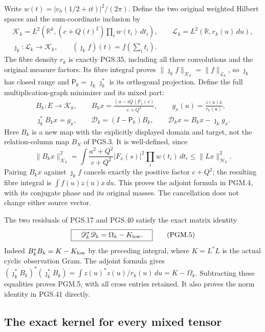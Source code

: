 Write \(w(t)=|v_h(1/2+it)|^2/(2\pi)\). Define the two original
weighted Hilbert spaces and the sum-coordinate inclusion by
\[
\begin{gathered}
 \mathscr K_k=L^2\left(\mathbb{R}^k,
                   (c+Q(t)^2)\prod_i w(t_i)\,dt_i\right),\qquad
 \mathscr L_k=L^2(\mathbb{R},r_k(u)\,du),\\
 \jmath_k:\mathscr L_k\longrightarrow\mathscr K_k,\qquad
          (\jmath_k f)(t)=f\left(\sum_i t_i\right).
\end{gathered}
\tag{PGM.3}\label{GraphV2:eq:pgm-hilbert}
\]
The fibre density \(r_k\) is exactly PGS.35, including all three
convolutions and the original measure factors. Its fibre integral
proves \(\|\jmath_k f\|_{\mathscr K_k}=\|f\|_{\mathscr L_k}\),
so \(\jmath_k\) has closed range and
\(\mathsf P_k=\jmath_k\jmath_k^*\) is its orthogonal projection.
Define the full multiplication-graph minimizer and its mixed part:
\[
\begin{gathered}
 B_k:E\longrightarrow\mathscr K_k,\qquad
 B_kx=\frac{(a-iQ)F_x(s)}{c+Q^2},\qquad
 g_x(u)=\frac{z(u)x}{r_k(u)},\\
 \jmath_k^*B_kx=g_x,\qquad
 \mathscr D_k=(I-\mathsf P_k)B_k,\qquad
 \mathscr D_kx=B_kx-\jmath_k g_x .
\end{gathered}
\tag{PGM.4}\label{GraphV2:eq:pgm-map}
\]
Here \(B_k\) is a new map with the explicitly displayed domain and
target, not the relation-column map \(B_N\) of PGS.3. It is
well-defined, since
\[
 \|B_kx\|_{\mathscr K_k}^2
 =\int\frac{a^2+Q^2}{c+Q^2}|F_x(s)|^2\prod_iw(t_i)\,dt_i
 \leq\|Lx\|_{\mathscr H_k}^2.
\]
Pairing \(B_kx\) against \(\jmath_k f\) cancels exactly the
positive factor \(c+Q^2\); the resulting fibre integral is
\(\int\overline{f(u)}z(u)x\,du\). This proves the adjoint
formula in PGM.4, with its conjugate phase and its original masses.
The cancellation does not change either source vector.

The two residuals of PGS.17 and PGS.40 satisfy the exact matrix
identity
\[
 \boxed{\quad \mathscr D_k^*\mathscr D_k
                       =\Omega_k-K_{\rm low}.\quad}
 \tag{PGM.5}\label{GraphV2:eq:pgm-gram}
\]
Indeed \(B_k^*B_k=K-K_{\rm low}\) by the preceding integral,
where \(K=L^*L\) is the actual cyclic observation Gram.
The adjoint formula gives
\((\jmath_k^*B_k)^*(\jmath_k^*B_k)=
\int z(u)^*z(u)/r_k(u)\,du=K-\Omega_k\).
Subtracting these equalities proves PGM.5, with all cross entries
retained. It also proves the norm identity in PGS.41 directly.

\subsection{The exact kernel for every mixed tensor}

